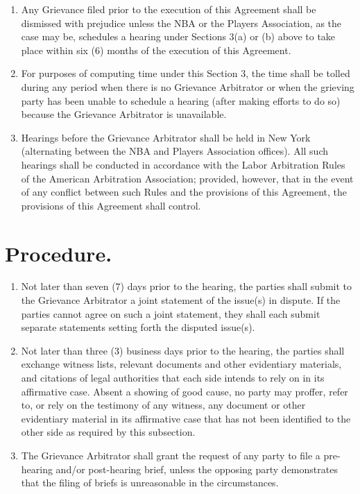 \documentclass[
]{book}
\providecommand{\tightlist}{%
  \setlength{\itemsep}{0pt}\setlength{\parskip}{0pt}}
\begin{document}
\begin{enumerate}
\item
  Any Grievance filed prior to the execution of this Agreement shall be dismissed with prejudice unless the NBA or the Players Association, as the case may be, schedules a hearing under Sections 3(a) or (b) above to take place within six (6) months of the execution of this Agreement.
\item
  For purposes of computing time under this Section 3, the time shall be tolled during any period when there is no Grievance Arbitrator or when the grieving party has been unable to schedule a hearing (after making efforts to do so) because the Grievance Arbitrator is unavailable.
\item
  Hearings before the Grievance Arbitrator shall be held in New York (alternating between the NBA and Players Association offices). All such hearings shall be conducted in accordance with the Labor Arbitration Rules of the American Arbitration Association; provided, however, that in the event of any conflict between such Rules and the provisions of this Agreement, the provisions of this Agreement shall control.
\end{enumerate}

\hypertarget{procedure.}{%
\section{Procedure.}\label{procedure.}}

\begin{enumerate}
\def\labelenumi{(\alph{enumi})}
\tightlist
\item
  Not later than seven (7) days prior to the hearing, the parties shall submit to the Grievance Arbitrator a joint statement of the issue(s) in dispute. If the parties cannot agree on such a joint statement, they shall each submit separate statements setting forth the disputed issue(s).
\item
  Not later than three (3) business days prior to the hearing, the parties shall exchange witness lists, relevant documents and other evidentiary materials, and citations of legal authorities that each side intends to rely on in its affirmative case. Absent a showing of good cause, no party may proffer, refer to, or rely on the testimony of any witness, any document or other evidentiary material in its affirmative case that has not been identified to the other side as required by this subsection.
\item
  The Grievance Arbitrator shall grant the request of any party to file a pre-hearing and/or post-hearing brief, unless the opposing party demonstrates that the filing of briefs is unreasonable in the circumstances.
\end{enumerate}
\end{document}
